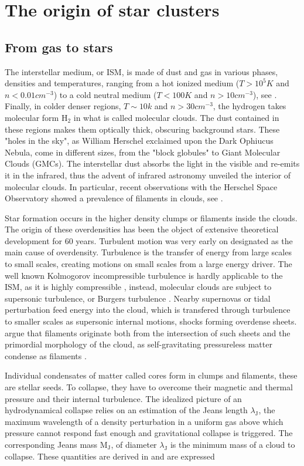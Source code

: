 \section{The origin of star clusters}

\subsection{From gas to stars}

The interstellar medium, or ISM, is made of dust and gas in various phases, densities and temperatures, ranging from a hot ionized medium ($T>10^5 K$ and $n < 0.01 cm^{-3}$) to a cold neutral medium ($T<100 K$ and $n > 10 cm^{-3}$),  see \cite{Field1969}. Finally, in colder denser regions, $T\sim 10k$ and $n>30cm^{-3}$, the hydrogen takes molecular form H$_2$ in what is called molecular clouds. The dust contained in these regions makes them optically thick, obscuring background stars. These "holes in the sky", as William Herschel exclaimed upon the Dark Ophiucus Nebula\citep{Houghton1942}, come in different sizes, from the "block globules" to Giant Molecular Clouds (GMCs).
The interstellar dust absorbs the light in the visible and re-emits it in the infrared, thus the advent of infrared astronomy unveiled the interior of molecular clouds. In particular, recent observations with the Herschel Space Observatory showed a prevalence of filaments in clouds, see \cite{Andre2010}.

Star formation occurs in the higher density clumps or filaments inside the clouds. The origin of these overdensities has been the object of extensive theoretical development for 60 years. Turbulent motion was very early on designated as the main cause of overdensity. Turbulence is the transfer of energy from large scales to small scales, creating motions on small scales from a large energy driver. The well known Kolmogorov incompressible turbulence is hardly applicable to the ISM, as it is highly compressible \citep{Scalo1998}, instead, molecular clouds are subject to supersonic turbulence, or Burgers turbulence \citep{Frisch2001}. Nearby supernovas or tidal perturbation feed energy into the cloud, which is transfered through turbulence to smaller scales as supersonic internal motions, shocks forming overdense sheets. \cite{McKee2007} argue that filaments originate both from the intersection of such sheets and the primordial morphology of the cloud, as self-gravitating pressureless matter condense as filaments \citep{Springel2005}.


Individual condensates of matter called cores form in clumps and filaments, these are stellar seeds. To collapse, they have to overcome their magnetic and thermal pressure and their internal turbulence. The idealized picture of an hydrodynamical collapse relies on an estimation of the Jeans length $\lambda_\textrm{J}$, the maximum wavelength of a density perturbation in a uniform gas above which pressure cannot respond fast enough and gravitational collapse is triggered. The corresponding Jeans mass M$_\textrm{J}$, of diameter $\lambda_\textrm{J}$ is the minimum mass of a cloud to collapse. These quantities are derived in \cite{BT} and are expressed

